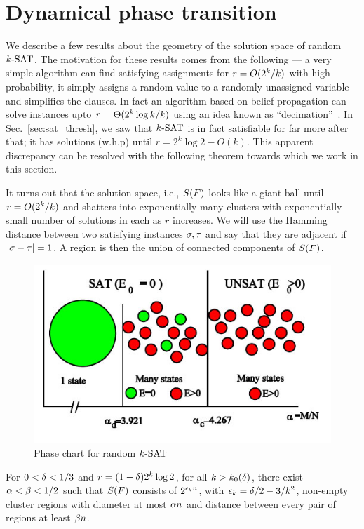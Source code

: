 \documentclass[letterpaper, 10pt, twocolumn, reqno]{amsart}
\begin{document}
\section{Dynamical phase transition}
\label{sec:dynamical_transition}

We describe a few results about the geometry of the solution space of random $\ksat$. The motivation for these results comes from the following --- a very
simple algorithm can find satisfying assignments for $r = \bigo(2^k/k)$ with
high probability, it simply assigns a random value to a randomly unassigned variable and simplifies the clauses. In fact an algorithm based on belief
propagation can solve instances upto $r = \bigth(2^k \log k/k)$ using an idea known as ``decimation''~\cite{montanari2007solving}. In Sec.~\ref{sec:sat_thresh}, we saw that $\ksat$ is in fact satisfiable for far more after that; it has solutions (w.h.p) until $r = 2^k \log 2 - O(k)$. This apparent discrepancy can
be resolved with the following theorem towards which we work in this section.

It turns out that the solution space, i.e., $\sf$ looks like a giant ball
until $r = \bigo(2^k/k)$ and shatters into exponentially many clusters with
exponentially small number of solutions in each as $r$ increases. We will use the Hamming distance between two satisfying instances $\s,\t$ and say that they are adjacent if $\abs{\s-\t} = 1$. A region is then the union of connected components of $\sf$.

\begin{figure}[H]
\centering
\includegraphics[width=.7\columnwidth]{phase_chart.jpg}
\caption{Phase chart for random $\ksat$}
\label{fig:phase_chart}
\end{figure}

\begin{theorem}
For $0 < \d < 1/3$ and $r = (1-\d) 2^k \log 2$, for all $k > k_0(\d)$, there exist $\a < \b < 1/2$ such that $\sf$ consists of $2^{\e_k n}$, with $\e_k = \d/2 - 3/k^2$, non-empty cluster regions with diameter at most $\a n$ and distance between every pair of regions at least $\b n$.
\label{thm:shatter}
\end{theorem}
%
\end{document}
